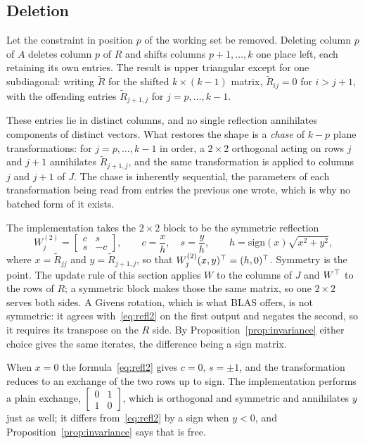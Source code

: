 \subsection{Deletion}
\label{ssec:delete}

Let the constraint in position $p$ of the working set be removed. Deleting column
$p$ of $A$ deletes column $p$ of $R$ and shifts columns $p+1,\dots,k$ one place
left, each retaining its own entries. The result is upper triangular except for
one subdiagonal: writing $\tilde R$ for the shifted $k \times (k-1)$ matrix,
$\tilde R_{ij} = 0$ for $i > j+1$, with the offending entries
$\tilde R_{j+1,j}$ for $j = p,\dots,k-1$.

These entries lie in distinct columns, and no single reflection annihilates
components of distinct vectors. What restores the shape is a \emph{chase} of
$k-p$ plane transformations: for $j = p,\dots,k-1$ in order, a $2\times2$
orthogonal acting on rows $j$ and $j+1$ annihilates $\tilde R_{j+1,j}$, and the
same transformation is applied to columns $j$ and $j+1$ of $J$. The chase is
inherently sequential, the parameters of each transformation being read from entries
the previous one wrote, which is why no batched form of it exists.

The implementation takes the $2 \times 2$ block to be the symmetric reflection
\begin{equation}
  W_j^{(2)} = \begin{bmatrix} c & s \\ s & -c \end{bmatrix},
  \qquad c = \frac{x}{h},\quad s = \frac{y}{h},
  \qquad h = \mathrm{sign}(x)\sqrt{x^2+y^2},
  \label{eq:refl2}
\end{equation}
where $x = \tilde R_{jj}$ and $y = \tilde R_{j+1,j}$, so that
$W_j^{(2)}(x,y)^{\top} = (h,0)^{\top}$. Symmetry is the point. The update rule of this
section applies $W$ to the columns of $J$ and $W^{\top}$ to the rows of $R$; a
symmetric block makes those the same matrix, so one $2\times2$ serves both sides.
A Givens rotation, which is what BLAS offers, is not symmetric: it agrees
with~\eqref{eq:refl2} on the first output and negates the second, so it requires
its transpose on the $R$ side. By Proposition~\ref{prop:invariance} either choice
gives the same iterates, the difference being a sign matrix.

\begin{remark}
When $x = 0$ the formula~\eqref{eq:refl2} gives $c = 0$, $s = \pm1$, and the
transformation reduces to an exchange of the two rows up to sign. The
implementation performs a plain exchange, $\left[\begin{smallmatrix} 0 & 1 \\ 1 &
0\end{smallmatrix}\right]$, which is orthogonal and symmetric and annihilates $y$
just as well; it differs from~\eqref{eq:refl2} by a sign when $y < 0$, and
Proposition~\ref{prop:invariance} says that is free.
\end{remark}

